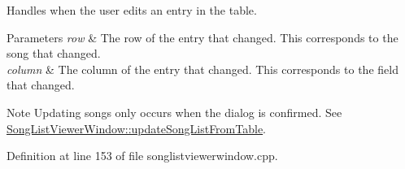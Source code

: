 Handles when the user edits an entry in the table. 


\begin{DoxyParams}{Parameters}
{\em row} & The row of the entry that changed. This corresponds to the song that changed. \\
\hline
{\em column} & The column of the entry that changed. This corresponds to the field that changed.\\
\hline
\end{DoxyParams}
\begin{DoxyNote}{Note}
Updating songs only occurs when the dialog is confirmed. See \mbox{\hyperlink{class_song_list_viewer_window_ad53bcfcb56d146d8ab1d9f91696b143f}{Song\+List\+Viewer\+Window\+::update\+Song\+List\+From\+Table}}. 
\end{DoxyNote}


Definition at line 153 of file songlistviewerwindow.\+cpp.


